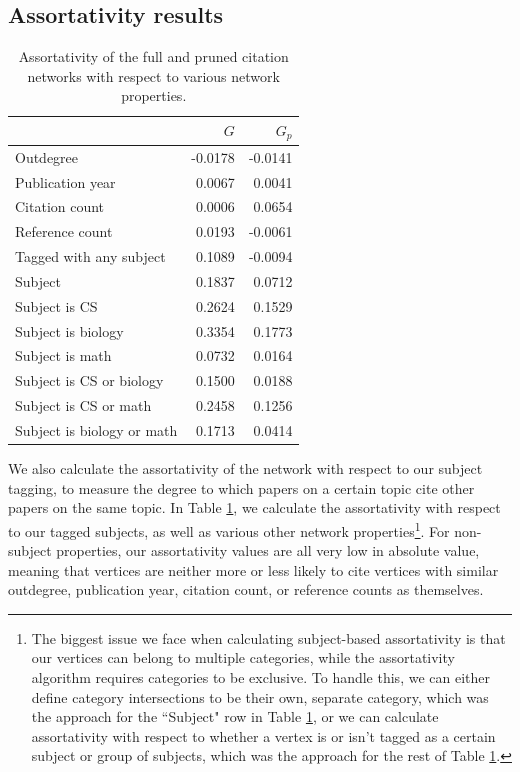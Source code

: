 \documentclass[12pt]{thesis}
\theoremstyle{plain}
\theoremstyle{definition}
\theoremstyle{remark}
\begin{document}
\subsection{Assortativity results}

\begin{table}[h]
\centering
\begin{tabular}{|l|r|r|}
\hline
 & $G$ & $G_p$ \\ \hline\hline
Outdegree & -0.0178 & -0.0141 \\ \hline
Publication year & 0.0067 & 0.0041 \\ \hline
Citation count & 0.0006 & 0.0654 \\ \hline
Reference count & 0.0193 & -0.0061 \\ \hline
Tagged with any subject & 0.1089 & -0.0094 \\ \hline
Subject & 0.1837 & 0.0712 \\ \hline
Subject is CS & 0.2624 & 0.1529 \\ \hline
Subject is biology & 0.3354 & 0.1773 \\ \hline
Subject is math & 0.0732 & 0.0164 \\ \hline
Subject is CS or biology & 0.1500 & 0.0188 \\ \hline
Subject is CS or math & 0.2458 & 0.1256 \\ \hline
Subject is biology or math & 0.1713 & 0.0414 \\ \hline
\end{tabular}
\caption{Assortativity of the full and pruned citation networks with respect to various network properties.}
\label{tab:assortativity}
\end{table}

We also calculate the assortativity of the network with respect to our subject tagging, to measure the degree to which papers on a certain topic cite other papers on the same topic. In Table \ref{tab:assortativity}, we calculate the assortativity with respect to our tagged subjects, as well as various other network properties\footnote{The biggest issue we face when calculating subject-based assortativity is that our vertices can belong to multiple categories, while the assortativity algorithm requires categories to be exclusive. To handle this, we can either define category intersections to be their own, separate category, which was the approach for the ``Subject" row in Table \ref{tab:assortativity}, or we can calculate assortativity with respect to whether a vertex is or isn't tagged as a certain subject or group of subjects, which was the approach for the rest of Table \ref{tab:assortativity}.}. For non-subject properties, our assortativity values are all very low in absolute value, meaning that vertices are neither more or less likely to cite vertices with similar outdegree, publication year, citation count, or reference counts as themselves.
\end{document}
